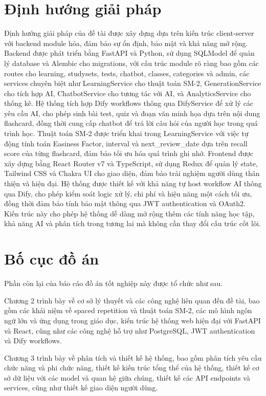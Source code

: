 \documentclass[../DoAn.tex]{subfiles}
\begin{document}
\section{Định hướng giải pháp}
\label{section:1.4}
Định hướng giải pháp của đề tài được xây dựng dựa trên kiến trúc client-server với backend module hóa, đảm bảo sự ổn định, bảo mật và khả năng mở rộng. Backend được phát triển bằng FastAPI và Python, sử dụng SQLModel để quản lý database và Alembic cho migrations, với cấu trúc module rõ ràng bao gồm các routes cho learning, studysets, tests, chatbot, classes, categories và admin, các services chuyên biệt như LearningService cho thuật toán SM-2, GenerationService cho tích hợp AI, ChatbotService cho tương tác với AI, và AnalyticsService cho thống kê. Hệ thống tích hợp Dify workflows thông qua DifyService để xử lý các yêu cầu AI, cho phép sinh bài test, quiz và đoạn văn minh họa dựa trên nội dung flashcard, đồng thời cung cấp chatbot để trả lời câu hỏi của người học trong quá trình học. Thuật toán SM-2 được triển khai trong LearningService với việc tự động tính toán Easiness Factor, interval và next\_review\_date dựa trên recall score của từng flashcard, đảm bảo tối ưu hóa quá trình ghi nhớ. Frontend được xây dựng bằng React Router v7 và TypeScript, sử dụng Redux để quản lý state, Tailwind CSS và Chakra UI cho giao diện, đảm bảo trải nghiệm người dùng thân thiện và hiện đại. Hệ thống được thiết kế với khả năng tự host workflow AI thông qua Dify, cho phép kiểm soát logic xử lý, chi phí và hiệu năng một cách tối ưu, đồng thời đảm bảo tính bảo mật thông qua JWT authentication và OAuth2. Kiến trúc này cho phép hệ thống dễ dàng mở rộng thêm các tính năng học tập, khả năng AI và phân tích trong tương lai mà không cần thay đổi cấu trúc cốt lõi.

\section{Bố cục đồ án}
\label{section:1.5}
Phần còn lại của báo cáo đồ án tốt nghiệp này được tổ chức như sau.

Chương 2 trình bày về cơ sở lý thuyết và các công nghệ liên quan đến đề tài, bao gồm các khái niệm về spaced repetition và thuật toán SM-2, các mô hình ngôn ngữ lớn và ứng dụng trong giáo dục, kiến trúc hệ thống web hiện đại với FastAPI và React, cũng như các công nghệ hỗ trợ như PostgreSQL, JWT authentication và Dify workflows.

Chương 3 trình bày về phân tích và thiết kế hệ thống, bao gồm phân tích yêu cầu chức năng và phi chức năng, thiết kế kiến trúc tổng thể của hệ thống, thiết kế cơ sở dữ liệu với các model và quan hệ giữa chúng, thiết kế các API endpoints và services, cũng như thiết kế giao diện người dùng.
\end{document}
